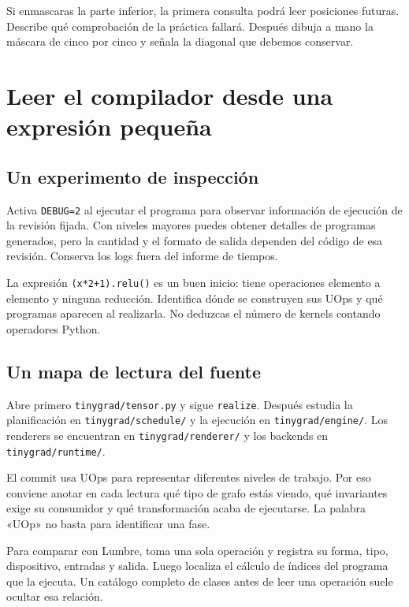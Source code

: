 \documentclass[12pt,a4paper,oneside]{report}
\begin{document}
\begin{practica}
Si enmascaras la parte inferior, la primera consulta podrá leer posiciones futuras. Describe qué comprobación de la práctica fallará. Después dibuja a mano la máscara de cinco por cinco y señala la diagonal que debemos conservar.

\end{practica}
\chapter{Leer el compilador desde una expresión pequeña}
\section{Un experimento de inspección}
Activa \texttt{DEBUG=2} al ejecutar el programa para observar información de ejecución de la revisión fijada. Con niveles mayores puedes obtener detalles de programas generados, pero la cantidad y el formato de salida dependen del código de esa revisión. Conserva los logs fuera del informe de tiempos.

La expresión \texttt{(x*2+1).relu()} es un buen inicio: tiene operaciones elemento a elemento y ninguna reducción. Identifica dónde se construyen sus UOps y qué programas aparecen al realizarla. No deduzcas el número de kernels contando operadores Python.

\section{Un mapa de lectura del fuente}
Abre primero \texttt{tinygrad/tensor.py} y sigue \texttt{realize}. Después estudia la planificación en \texttt{tinygrad/schedule/} y la ejecución en \texttt{tinygrad/engine/}. Los renderers se encuentran en \texttt{tinygrad/renderer/} y los backends en \texttt{tinygrad/runtime/}.

El commit usa UOps para representar diferentes niveles de trabajo. Por eso conviene anotar en cada lectura qué tipo de grafo estás viendo, qué invariantes exige su consumidor y qué transformación acaba de ejecutarse. La palabra «UOp» no basta para identificar una fase.

Para comparar con Lumbre, toma una sola operación y registra su forma, tipo, dispositivo, entradas y salida. Luego localiza el cálculo de índices del programa que la ejecuta. Un catálogo completo de clases antes de leer una operación suele ocultar esa relación.
\end{document}
